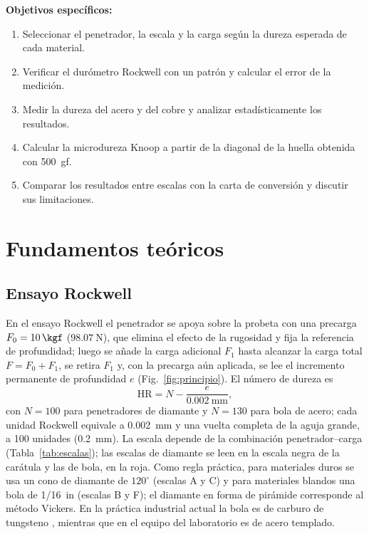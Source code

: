 \documentclass[journal,11pt]{IEEEtran}
\begin{document}
\textbf{Objetivos específicos:}
\begin{enumerate}
\item Seleccionar el penetrador, la escala y la carga según la dureza esperada de cada material.
\item Verificar el durómetro Rockwell con un patrón y calcular el error de la medición.
\item Medir la dureza del acero y del cobre y analizar estadísticamente los resultados.
\item Calcular la microdureza Knoop a partir de la diagonal de la huella obtenida con 500~gf.
\item Comparar los resultados entre escalas con la carta de conversión y discutir sus limitaciones.
\end{enumerate}

\section{Fundamentos teóricos}
\subsection{Ensayo Rockwell}
En el ensayo Rockwell \cite{astm18,iso6508} el penetrador se apoya sobre la probeta con una precarga $F_0=\SI{10}{\kgf}$ ($\SI{98,07}{\newton}$), que elimina el efecto de la rugosidad y fija la referencia de profundidad; luego se añade la carga adicional $F_1$ hasta alcanzar la carga total $F=F_0+F_1$, se retira $F_1$ y, con la precarga aún aplicada, se lee el incremento permanente de profundidad $e$ (Fig.~\ref{fig:principio}). El número de dureza es
\begin{equation}
\mathrm{HR}=N-\frac{e}{\SI{0,002}{\milli\metre}},
\label{eq:rockwell}
\end{equation}
con $N=100$ para penetradores de diamante y $N=130$ para bola de acero; cada unidad Rockwell equivale a \SI{0,002}{\milli\metre} y una vuelta completa de la aguja grande, a 100 unidades (\SI{0,2}{\milli\metre}). La escala depende de la combinación penetrador--carga (Tabla~\ref{tab:escalas}); las escalas de diamante se leen en la escala negra de la carátula y las de bola, en la roja. Como regla práctica, para materiales duros se usa un cono de diamante de $120^{\circ}$ (escalas A y C) y para materiales blandos una bola de 1/16~in (escalas B y F); el diamante en forma de pirámide corresponde al método Vickers. En la práctica industrial actual la bola es de carburo de tungsteno \cite{iso6508}, mientras que en el equipo del laboratorio es de acero templado.
\end{document}
